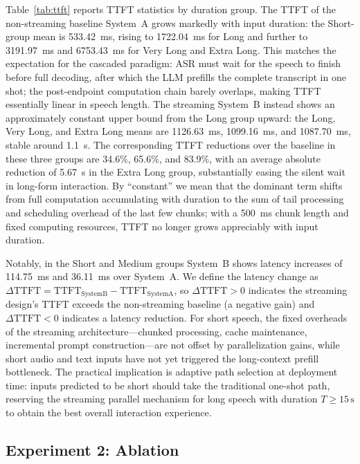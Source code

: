 \documentclass[conference]{IEEEtran}
\begin{document}
Table~\ref{tab:ttft} reports TTFT statistics by duration group. The TTFT of the non-streaming baseline System~A grows markedly with input duration: the Short-group mean is 533.42~ms, rising to 1722.04~ms for Long and further to 3191.97~ms and 6753.43~ms for Very Long and Extra Long. This matches the expectation for the cascaded paradigm: ASR must wait for the speech to finish before full decoding, after which the LLM prefills the complete transcript in one shot; the post-endpoint computation chain barely overlaps, making TTFT essentially linear in speech length. The streaming System~B instead shows an approximately constant upper bound from the Long group upward: the Long, Very Long, and Extra Long means are 1126.63~ms, 1099.16~ms, and 1087.70~ms, stable around 1.1~s. The corresponding TTFT reductions over the baseline in these three groups are 34.6\%, 65.6\%, and 83.9\%, with an average absolute reduction of 5.67~s in the Extra Long group, substantially easing the silent wait in long-form interaction. By ``constant'' we mean that the dominant term shifts from full computation accumulating with duration to the sum of tail processing and scheduling overhead of the last few chunks; with a 500~ms chunk length and fixed computing resources, TTFT no longer grows appreciably with input duration.

Notably, in the Short and Medium groups System~B shows latency increases of 114.75~ms and 36.11~ms over System~A. We define the latency change as $\Delta \mathrm{TTFT}=\mathrm{TTFT}_{\mathrm{SystemB}}-\mathrm{TTFT}_{\mathrm{SystemA}}$, so $\Delta \mathrm{TTFT}>0$ indicates the streaming design's TTFT exceeds the non-streaming baseline (a negative gain) and $\Delta \mathrm{TTFT}<0$ indicates a latency reduction. For short speech, the fixed overheads of the streaming architecture---chunked processing, cache maintenance, incremental prompt construction---are not offset by parallelization gains, while short audio and text inputs have not yet triggered the long-context prefill bottleneck. The practical implication is adaptive path selection at deployment time: inputs predicted to be short should take the traditional one-shot path, reserving the streaming parallel mechanism for long speech with duration $T\geq 15\,\mathrm{s}$ to obtain the best overall interaction experience.

\subsection{Experiment 2: Ablation}
\end{document}
